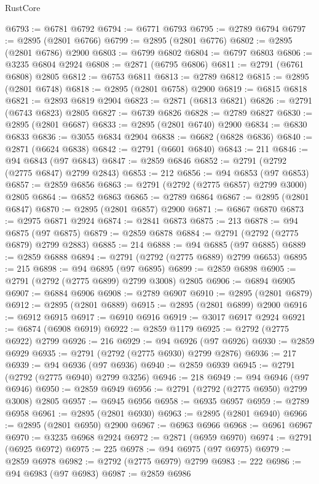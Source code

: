 \begin{lexlean}{RustCore}
\begin{coremodule}
@6793 := @6781 @6792
@6794 := @6771 @6793
@6795 := @2789 @6794
@6797 := @2895 (@2801 @6766)
@6799 := @2895 (@2801 @6776)
@6802 := @2895 (@2801 @6786) @2900
@6803 := @6799 @6802
@6804 := @6797 @6803
@6806 := @3235 @6804 @2924
@6808 := @2871 (@6795 @6806)
@6811 := @2791 (@6761 @6808) @2805
@6812 := @6753 @6811
@6813 := @2789 @6812
@6815 := @2895 (@2801 @6748)
@6818 := @2895 (@2801 @6758) @2900
@6819 := @6815 @6818
@6821 := @2893 @6819 @2904
@6823 := @2871 (@6813 @6821)
@6826 := @2791 (@6743 @6823) @2805
@6827 := @6739 @6826
@6828 := @2789 @6827
@6830 := @2895 (@2801 @6687)
@6833 := @2895 (@2801 @6740) @2900
@6834 := @6830 @6833
@6836 := @3055 @6834 @2904
@6838 := @6682 (@6828 @6836)
@6840 := @2871 (@6624 @6838)
@6842 := @2791 (@6601 @6840)
@6843 := 211
@6846 := @94 @6843 (@97 @6843)
@6847 := @2859 @6846
@6852 := @2791 (@2792 (@2775 @6847) @2799 @2843)
@6853 := 212
@6856 := @94 @6853 (@97 @6853)
@6857 := @2859 @6856
@6863 := @2791 (@2792 (@2775 @6857) @2799 @3000) @2805
@6864 := @6852 @6863
@6865 := @2789 @6864
@6867 := @2895 (@2801 @6847)
@6870 := @2895 (@2801 @6857) @2900
@6871 := @6867 @6870
@6873 := @2975 @6871 @2924
@6874 := @2841 @6873
@6875 := 213
@6878 := @94 @6875 (@97 @6875)
@6879 := @2859 @6878
@6884 := @2791 (@2792 (@2775 @6879) @2799 @2883)
@6885 := 214
@6888 := @94 @6885 (@97 @6885)
@6889 := @2859 @6888
@6894 := @2791 (@2792 (@2775 @6889) @2799 @6653)
@6895 := 215
@6898 := @94 @6895 (@97 @6895)
@6899 := @2859 @6898
@6905 := @2791 (@2792 (@2775 @6899) @2799 @3008) @2805
@6906 := @6894 @6905
@6907 := @6884 @6906
@6908 := @2789 @6907
@6910 := @2895 (@2801 @6879)
@6912 := @2895 (@2801 @6889)
@6915 := @2895 (@2801 @6899) @2900
@6916 := @6912 @6915
@6917 := @6910 @6916
@6919 := @3017 @6917 @2924
@6921 := @6874 (@6908 @6919)
@6922 := @2859 @1179
@6925 := @2792 (@2775 @6922) @2799
@6926 := 216
@6929 := @94 @6926 (@97 @6926)
@6930 := @2859 @6929
@6935 := @2791 (@2792 (@2775 @6930) @2799 @2876)
@6936 := 217
@6939 := @94 @6936 (@97 @6936)
@6940 := @2859 @6939
@6945 := @2791 (@2792 (@2775 @6940) @2799 @3256)
@6946 := 218
@6949 := @94 @6946 (@97 @6946)
@6950 := @2859 @6949
@6956 := @2791 (@2792 (@2775 @6950) @2799 @3008) @2805
@6957 := @6945 @6956
@6958 := @6935 @6957
@6959 := @2789 @6958
@6961 := @2895 (@2801 @6930)
@6963 := @2895 (@2801 @6940)
@6966 := @2895 (@2801 @6950) @2900
@6967 := @6963 @6966
@6968 := @6961 @6967
@6970 := @3235 @6968 @2924
@6972 := @2871 (@6959 @6970)
@6974 := @2791 (@6925 @6972)
@6975 := 225
@6978 := @94 @6975 (@97 @6975)
@6979 := @2859 @6978
@6982 := @2792 (@2775 @6979) @2799
@6983 := 222
@6986 := @94 @6983 (@97 @6983)
@6987 := @2859 @6986

\end{coremodule}
\end{lexlean}
